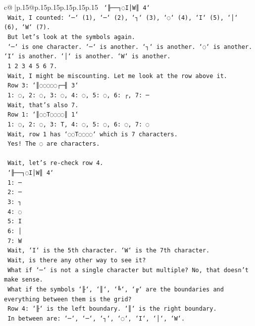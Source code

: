 \documentclass{article}
\begin{document}
{\begin{supertabular}{c@{$\;$}|p{.15\linewidth}@{}p{.15\linewidth}p{.15\linewidth}p{.15\linewidth}p{.15\linewidth}p{.15\linewidth}}
{{{\texttt{    `╟──┐◌I│W║ 4`} \\
\texttt{    Wait, I counted: `─` (1), `─` (2), `┐` (3), `◌` (4), `I` (5), `│` (6), `W` (7).} \\
\texttt{    But let's look at the symbols again.} \\
\texttt{    `─` is one character. `─` is another. `┐` is another. `◌` is another. `I` is another. `│` is another. `W` is another.} \\
\texttt{    1 2 3 4 5 6 7.} \\
\texttt{    Wait, I might be miscounting. Let me look at the row above it.} \\
\texttt{    Row 3: `║◌◌◌◌◌┌─╢ 3`} \\
\texttt{    1: ◌, 2: ◌, 3: ◌, 4: ◌, 5: ◌, 6: ┌, 7: ─} \\
\texttt{    Wait, that's also 7.} \\
\texttt{    Row 1: `║◌◌T◌◌◌◌║ 1`} \\
\texttt{    1: ◌, 2: ◌, 3: T, 4: ◌, 5: ◌, 6: ◌, 7: ◌} \\
\texttt{    Wait, row 1 has `◌◌T◌◌◌◌` which is 7 characters.} \\
\texttt{    Yes! The ◌ are characters.} \\
\\ 
\texttt{    Wait, let's re{-}check row 4.} \\
\texttt{    `╟──┐◌I│W║ 4`} \\
\texttt{    1: ─} \\
\texttt{    2: ─} \\
\texttt{    3: ┐} \\
\texttt{    4: ◌} \\
\texttt{    5: I} \\
\texttt{    6: │} \\
\texttt{    7: W} \\
\texttt{    Wait, `I` is the 5th character. `W` is the 7th character.} \\
\texttt{    Wait, is there any other way to see it?} \\
\texttt{    What if `─` is not a single character but multiple? No, that doesn't make sense.} \\
\texttt{    What if the symbols `╟`, `║`, `╚`, `╔` are the boundaries and everything between them is the grid?} \\
\texttt{    Row 4: `╟` is the left boundary. `║` is the right boundary.} \\
\texttt{    In between are: `─`, `─`, `┐`, `◌`, `I`, `│`, `W`.} \\
}}}
\end{supertabular}}
\end{document}
